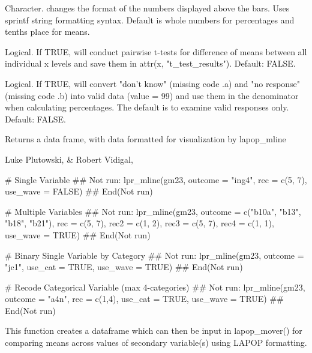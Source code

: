\documentclass[a4paper]{book}
\begin{document}
\begin{Arguments}
\begin{ldescription}
\item[\code{cfmt}] Character. changes the format of the numbers displayed above the bars.
Uses sprintf string formatting syntax. Default is whole numbers for percentages
and tenths place for means.

\item[\code{ttest}] Logical.  If TRUE, will conduct pairwise t-tests for difference
of means between all individual x levels and save them in attr(x,
"t\_test\_results"). Default: FALSE.

\item[\code{keep\_nr}] Logical.  If TRUE, will convert "don't know" (missing code .a)
and "no response" (missing code .b) into valid data (value = 99) and use them
in the denominator when calculating percentages.  The default is to examine
valid responses only.  Default: FALSE.
\end{ldescription}
\end{Arguments}
%
\begin{Value}
Returns a data frame, with data formatted for visualization by lapop\_mline
\end{Value}
%
\begin{Author}
Luke Plutowski,  \& Robert Vidigal, 
\end{Author}
%
\begin{Examples}
\begin{ExampleCode}

# Single Variable
## Not run: 
lpr_mline(gm23,
outcome = "ing4",
rec = c(5, 7),
use_wave = FALSE)
## End(Not run)

# Multiple Variables
## Not run: 
lpr_mline(gm23,
outcome = c("b10a", "b13", "b18", "b21"),
rec = c(5, 7),
rec2 = c(1, 2),
rec3 = c(5, 7),
rec4 = c(1, 1),
use_wave = TRUE)
## End(Not run)

# Binary Single Variable by Category
## Not run: 
lpr_mline(gm23,
outcome = "jc1",
use_cat = TRUE,
use_wave = TRUE)
## End(Not run)

# Recode Categorical Variable (max 4-categories)
## Not run: 
lpr_mline(gm23,
outcome = "a4n",
rec = c(1,4),
use_cat = TRUE,
use_wave = TRUE)
## End(Not run)
\end{ExampleCode}
\end{Examples}
%
\begin{Description}
This function creates a dataframe which can then be input in lapop\_mover() for
comparing means across values of secondary variable(s) using LAPOP formatting.
\end{Description}
\end{document}

